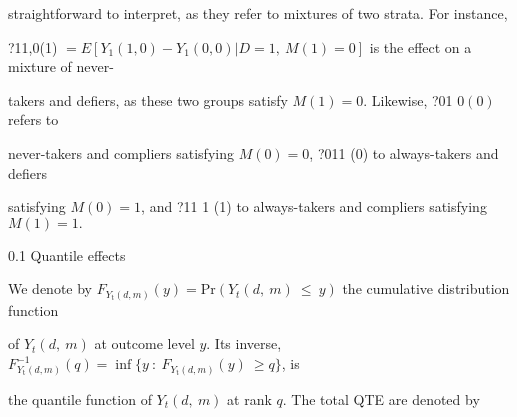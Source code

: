 \documentclass[a4paper,12pt]{article}
\begin{document}
straightforward to interpret, as they refer to mixtures of two strata. For instance,

?11,0(1) $=E[Y_{1}(1,0)-Y_{1}(0,0)|D=1,\ M(1)=0]$ is the effect on a mixture of never-

takers and defiers, as these two groups satisfy $M(1)=0$. Likewise, ?01 $0(0)$ refers to

never-takers and compliers satisfying $M(0)=0$, ?011 (0) to always-takers and defiers

satisfying $M(0)=1$, and ?11 1 (1) to always-takers and compliers satisfying $M(1)=1.$

0.1 Quantile effects

We denote by $F_{Y_{\mathrm{t}}(d,m)}(y) = \mathrm{P}\mathrm{r}(Y_{t}(d,\ m)\ \leq\ y)$ the cumulative distribution function

of $Y_{t}(d,\ m)$ at outcome level $y$. Its inverse, $F_{Y_{\mathrm{t}}(d,m)}^{-1}(q) =\displaystyle \inf\{y\ :\ F_{Y_{\mathrm{t}}(d,m)}(y)\ \geq q\}$, is

the quantile function of $Y_{t}(d,\ m)$ at rank $q$. The total QTE are denoted by
\end{document}
